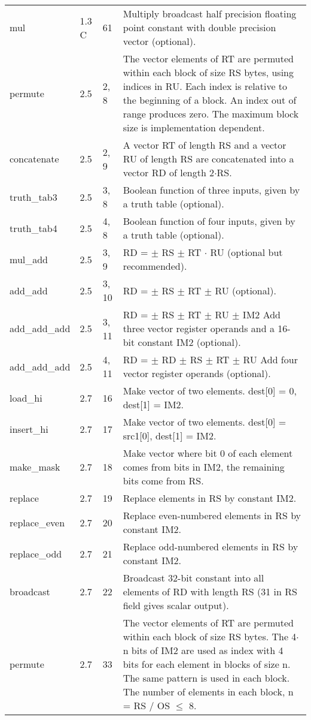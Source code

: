 \documentclass[forwardcom.tex]{subfiles}
\begin{document}
\begin{longtable} {|p{20mm}|p{10mm}|p{8mm}|p{75mm}|}
mul           & 1.3 C & 61 & Multiply broadcast half precision floating point constant with double precision vector (optional). \\
permute       & 2.5 & 2, 8  & The vector elements of RT are permuted within each block of size RS bytes, using indices in RU. Each index is relative to the
beginning of a block. An index out of range produces zero. The
maximum block size is implementation dependent. \\
concatenate   & 2.5 & 2, 9 & A vector RT of length RS and a vector RU of length RS are
concatenated into a vector RD of length 2$\cdot$RS. \\
truth\_tab3   & 2.5 & 3, 8 & Boolean function of three inputs, given by a truth table (optional). \\
truth\_tab4   & 2.5 & 4, 8 & Boolean function of four inputs, given by a truth table (optional). \\
mul\_add      & 2.5 & 3, 9 & RD = $\pm$ RS $\pm$ RT $\cdot$ RU (optional but recommended). \\
add\_add      & 2.5 & 3, 10 & RD = $\pm$ RS $\pm$ RT $\pm$ RU (optional). \\
add\_add\_add & 2.5 & 3, 11 & RD = $\pm$ RS $\pm$ RT $\pm$ RU $\pm$ IM2 
Add three vector register operands and a 16-bit constant IM2 (optional). \\
add\_add\_add & 2.5 & 4, 11 & RD = $\pm$ RD $\pm$ RS $\pm$ RT $\pm$ RU
Add four vector register operands (optional). \\
load\_hi      & 2.7 & 16 & Make vector of two elements. dest[0] = 0, dest[1] = IM2. \\
insert\_hi    & 2.7 & 17 & Make vector of two elements. dest[0] = src1[0], dest[1] = IM2. \\
make\_mask    & 2.7 & 18 & Make vector where bit 0 of each element comes from bits in IM2, the remaining bits come from RS. \\
replace       & 2.7 & 19 & Replace elements in RS by constant IM2. \\
replace\_even & 2.7 & 20 & Replace even-numbered elements in RS by constant
IM2. \\
replace\_odd  & 2.7 & 21 & Replace odd-numbered elements in RS by constant
IM2. \\
broadcast     & 2.7 & 22 & Broadcast 32-bit constant into all elements of RD with length RS (31 in RS field gives scalar output). \\
permute       & 2.7 & 33 & The vector elements of RT are permuted within each block of size RS bytes. The 4$\cdot$n bits of IM2 are used as index with 4 bits for
each element in blocks of size n. The same pattern is used in each
block. The number of elements in each block, n = RS / OS $\leq$ 8. \\
\hline
\end{longtable}
\end{document}
